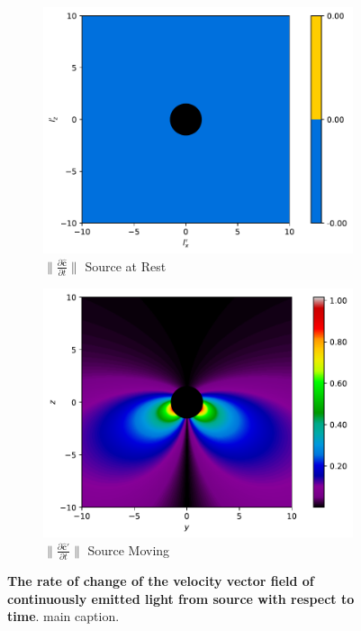 \begin{figure}[H]
	\centering
	\begin{subfigure}{0.45\textwidth}
		\centering
		\includegraphics[width=\textwidth]{images/pdf/Rate_of_change_of_lights_velocity_field_with_respect_to_t_u_is_0.pdf}
		\caption{$\|\frac{\partial \mathbf{\hat{c}}}{\partial t}\|$ Source at Rest}
		\label{fig: Rate of change of lights velocity field with respect to time subfig_2}
	\end{subfigure}
	\begin{subfigure}{0.45\textwidth}
		\centering
		\includegraphics[width=\textwidth]{images/pdf/Rate_of_change_of_lights_velocity_field_with_respect_to_t.pdf}
		\caption{$\|\frac{\partial \mathbf{\hat{c}}'}{\partial t}\|$ Source Moving}
		\label{fig: Rate of change of lights velocity field with respect to time subfig_3}
	\end{subfigure}
	\caption{\textbf{The rate of change of the velocity vector field of continuously emitted light from source with respect to time}. main caption.}
	\label{fig: Rate of change of lights velocity field with respect to time}
\end{figure}

